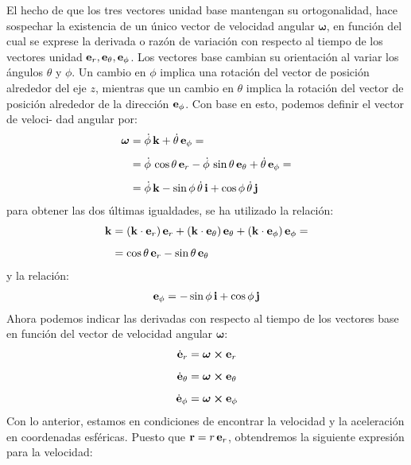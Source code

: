 \documentclass[12pt]{article}
\begin{document}
El hecho de que los tres vectores unidad base mantengan su ortogonalidad, hace sospechar la existencia de un único vector de velocidad angular $\bm{\omega}$, en función del cual se exprese la derivada o razón de variación con respecto al tiempo de los vectores unidad $\vb{e}_{r}, \vb{e}_{\theta}, \vb{e}_{\phi}$. Los vectores base cambian su orientación al variar los ángulos $\theta$ y $\phi$. Un cambio en $\phi$ implica una rotación del vector de posición alrededor del eje $z$, mientras que un cambio en $\theta$ implica la rotación del vector de posición alrededor de la dirección $\vb{e}_{\phi}$. Con base en esto, podemos definir el vector de veloci- 
dad angular por:
\begin{align}
\begin{aligned}
\bm{\omega} &= \dot{\phi} \, \vb{k} + \dot{\theta} \, \vb{e}_{\phi} = \\[0.5em]
&= \dot{\phi} \, \cos \theta \, \vb{e}_{r} - \dot{\phi} \, \sin \theta \, \vb{e}_{\theta} + \dot{\theta} \, \vb{e}_{\phi} = \\[0.5em]
&= \dot{\phi} \, \vb{k} - \sin \phi \, \dot{\theta} \, \vb{i} + \cos \phi \, \dot{\theta} \, \vb{j}
\end{aligned}
\label{eq:ecuacion_02_47}
\end{align}
para obtener las dos últimas igualdades, se ha utilizado la relación:
\begin{align*}
    \vb{k} &= \left( \vb{k} \cdot \vb{e}_{r} \right) \vb{e}_{r} + \left( \vb{k} \cdot \vb{e}_{\theta} \right) \vb{e}_{\theta} + \left( \vb{k} \cdot \vb{e}_{\phi} \right) \vb{e}_{\phi} = \\[0.5em]
    &= \cos \theta \, \vb{e}_{r} - \sin \theta \, \vb{e}_{\theta}
\end{align*}
y la relación:
\begin{align*}
    \vb{e}_{\phi} = - \sin \phi \, \vb{i} + \cos \phi \, \vb{j}
\end{align*}
Ahora podemos indicar las derivadas con respecto al tiempo de los vectores base en función del vector de velocidad angular $\bm{\omega}$:
\begin{align}
    \dot{\vb{e}}_{r} &= \bm{\omega} \cp \vb{e}_{r} \label{eq:ecuacion_02_48} \\[0.5em]
    \dot{\vb{e}}_{\theta} &= \bm{\omega} \cp \vb{e}_{\theta} \label{eq:ecuacion_02_49} \\[0.5em]
    \dot{\vb{e}}_{\phi} &= \bm{\omega} \cp \vb{e}_{\phi} \label{eq:ecuacion_02_50}
\end{align}
Con lo anterior, estamos en condiciones de encontrar la velocidad y la aceleración en coordenadas esféricas. Puesto que $\vb{r} = r \, \vb{e}_{r}$, obtendremos la siguiente expresión para la velocidad:
\end{document}
